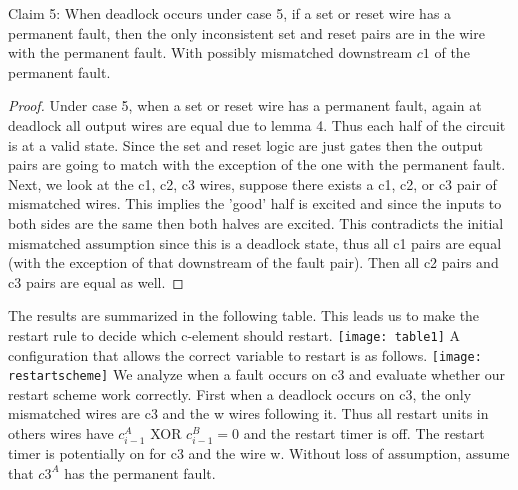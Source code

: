\documentclass{article}
\begin{document}
Claim 5:  When deadlock occurs under case 5, if a set or reset wire has a permanent fault, then the only inconsistent set and reset pairs are in the wire with the permanent fault.  With possibly mismatched downstream $c1$ of the permanent fault.
\begin{proof}
Under case 5, when a set or reset wire has a permanent fault, again at deadlock all output wires are equal due to lemma 4.  Thus each half of the circuit is at a valid state.  Since the set and reset logic are just gates then the output pairs are going to match with the exception of the one with the permanent fault.  Next, we look at the c1, c2, c3 wires, suppose there exists a c1, c2, or c3 pair of mismatched wires.  This implies the 'good' half is excited and since the inputs to both sides are the same then both halves are excited.  This contradicts the initial mismatched assumption since this is a deadlock state, thus all c1 pairs are equal (with the exception of that downstream of the fault pair).  Then all c2 pairs and c3 pairs are equal as well. \newline
\end{proof}
\newline
The results are summarized in the following table.  
This leads us to make the restart rule to decide which c-element should restart.  \newline
\texttt{[image: table1]}
A configuration that allows the correct variable to restart is as follows. \newline
\texttt{[image: restartscheme]}
We analyze when a fault occurs on c3 and evaluate whether our restart scheme work correctly.  First when a deadlock occurs on c3, the only mismatched wires are c3 and the w wires following it.  Thus all restart units in others wires have $c_{i-1}^A$ XOR $c_{i-1}^B=0$ and the restart timer is off.  The restart timer is potentially on for c3 and the wire w.  Without loss of assumption, assume that $c3^A$ has the permanent fault.  


\end{document}
